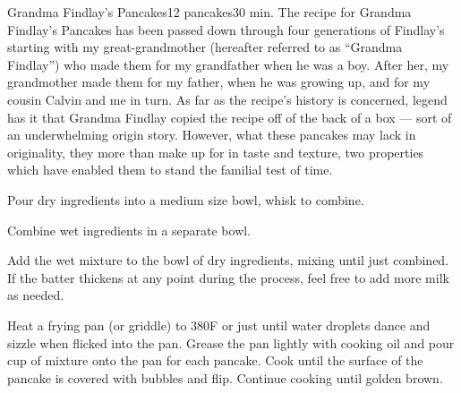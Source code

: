 \begin{recipe}{Grandma Findlay's Pancakes}{12 pancakes}{30 min.}
\freeform The recipe for Grandma Findlay's Pancakes has been passed down through
four generations of Findlay's starting with my great-grandmother (hereafter
referred to as \enquote{Grandma Findlay}) who made them for my grandfather when he was
a boy. After her, my grandmother made them for my father, when he was growing
up, and for my cousin Calvin and me in turn. As far as the recipe's history is
concerned, legend has it that Grandma Findlay copied the recipe off of the back
of a box --- sort of an underwhelming origin story. However, what these pancakes
may lack in originality, they more than make up for in taste and texture, two
properties which have enabled them to stand the familial test of time.

Pour dry ingredients into a medium size bowl, whisk to combine.

Combine wet ingredients in a separate bowl.

\newstep Add the wet mixture to the bowl of dry ingredients, mixing until just
combined.  If the batter thickens at any point during the process, feel free to
add more milk as needed.

\newstep Heat a frying pan (or griddle) to 380\0F or just until water droplets
dance and sizzle when flicked into the pan.  Grease the pan lightly with cooking
oil and pour  cup of mixture onto the pan for each pancake. Cook until
the surface of the pancake is covered with bubbles and flip. Continue cooking
until golden brown.
\end{recipe}

